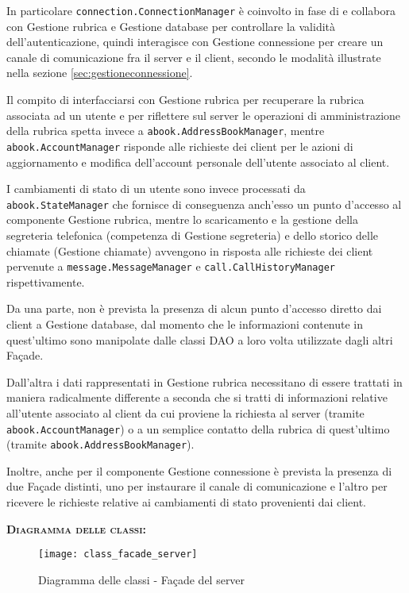 \begin{description}
In particolare \texttt{connection.ConnectionManager} è coinvolto in fase di  e collabora con \textsf{Gestione rubrica} e \textsf{Gestione database} per controllare la validità dell'autenticazione, quindi interagisce con \textsf{Gestione connessione} per creare un canale di comunicazione fra il server e il client, secondo le modalità illustrate nella sezione \ref{sec:gestioneconnessione}.

Il compito di interfacciarsi con \textsf{Gestione rubrica} per recuperare la rubrica associata ad un utente e per riflettere sul server le operazioni di amministrazione della rubrica spetta invece a \texttt{abook.AddressBookManager}, mentre \texttt{abook.AccountManager} risponde alle richieste dei client per le azioni di aggiornamento e modifica dell'account personale dell'utente associato al client.

I cambiamenti di stato di un utente sono invece processati da \texttt{abook.StateManager} che fornisce di conseguenza anch'esso un punto d'accesso al componente \textsf{Gestione rubrica}, mentre lo scaricamento e la gestione della segreteria telefonica (competenza di \textsf{Gestione segreteria}) e dello storico delle chiamate (\textsf{Gestione chiamate}) avvengono in risposta alle richieste dei client pervenute a \texttt{message.MessageManager} e \texttt{call.CallHistoryManager} rispettivamente.

Da una parte, non è prevista la presenza di alcun punto d'accesso diretto dai client a \textsf{Gestione database}, dal momento che le informazioni contenute in quest'ultimo sono manipolate dalle classi DAO a loro volta utilizzate dagli altri Façade.

Dall'altra i dati rappresentati in \textsf{Gestione rubrica} necessitano di essere trattati in maniera radicalmente differente a seconda che si tratti di informazioni relative all'utente associato al client da cui proviene la richiesta al server (tramite \texttt{abook.AccountManager}) o a un semplice contatto della rubrica di quest'ultimo (tramite \texttt{abook.AddressBookManager}).

Inoltre, anche per il componente \textsf{Gestione connessione} è prevista la presenza di due Façade distinti, uno per instaurare il canale di comunicazione e l'altro per ricevere le richieste relative ai cambiamenti di stato provenienti dai client.

	\item{\scshape\bfseries Diagramma delle classi:}
\begin{figure}[H]
  \centering
  \texttt{[image: class\_facade\_server]}
  \caption{Diagramma delle classi - Façade del server}\label{fig:facadeserver}
\end{figure}	
	

\end{description}
